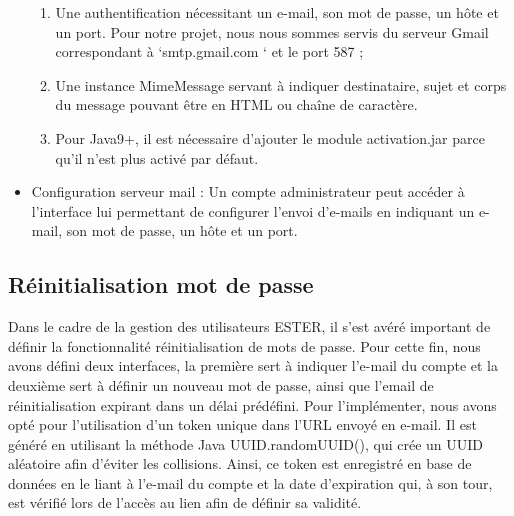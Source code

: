 \begin{itemize}
\begin{enumerate}
\item Une authentification nécessitant un e-mail, son mot de passe, un hôte et un port.  Pour notre projet, nous nous sommes servis du serveur Gmail correspondant à ‘smtp.gmail.com ‘ et le port 587 ;
\item Une instance MimeMessage servant à indiquer destinataire, sujet et corps du message pouvant être en HTML ou chaîne de caractère.
\item Pour Java9+, il est nécessaire d’ajouter le module activation.jar parce qu’il n’est plus activé par défaut. 
\end{enumerate}
\item Configuration serveur mail :
Un compte administrateur peut accéder à l’interface lui permettant de configurer l’envoi d’e-mails en indiquant un e-mail, son mot de passe, un hôte et un port. 

\end{itemize}
    

\subsection{Réinitialisation mot de passe}
	Dans le cadre de la gestion des utilisateurs ESTER, il s’est avéré important de définir la fonctionnalité réinitialisation de mots de passe. Pour cette fin, nous avons défini deux interfaces, la première sert à indiquer l’e-mail du compte et la deuxième sert à définir un nouveau mot de passe, ainsi que l’email de réinitialisation expirant dans un délai prédéfini. Pour l’implémenter, nous avons opté pour l’utilisation d’un token unique dans l’URL envoyé en e-mail. Il est généré en utilisant la méthode Java UUID.randomUUID(), qui crée un UUID aléatoire afin d’éviter les collisions. Ainsi, ce token est enregistré en base de données en le liant à l’e-mail du compte et la date d’expiration qui, à son tour, est vérifié lors de l’accès au lien afin de définir sa validité.
